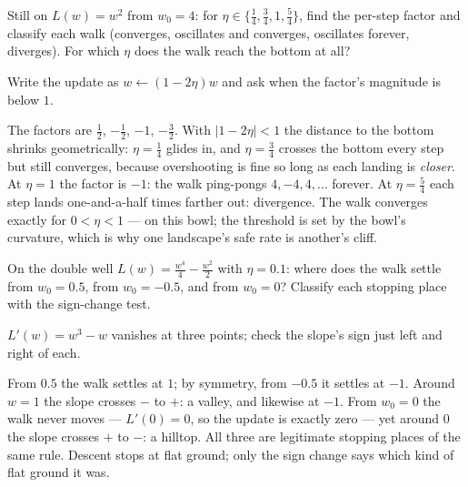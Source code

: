 \begin{problem}
Still on $L(w) = w^2$ from $w_0 = 4$: for
$\eta \in \{\tfrac14, \tfrac34, 1, \tfrac54\}$, find the per-step
factor and classify each walk (converges, oscillates and converges,
oscillates forever, diverges). For which $\eta$ does the walk reach
the bottom at all?
\begin{hint}
Write the update as $w \leftarrow (1 - 2\eta) w$ and ask when the
factor's magnitude is below $1$.
\end{hint}
\begin{solution}
The factors are $\tfrac12$, $-\tfrac12$, $-1$, $-\tfrac32$. With
$|1 - 2\eta| < 1$ the distance to the bottom shrinks geometrically:
$\eta = \tfrac14$ glides in, and $\eta = \tfrac34$ crosses the bottom
every step but still converges, because overshooting is fine so long
as each landing is \emph{closer}. At $\eta = 1$ the factor is $-1$:
the walk ping-pongs $4, -4, 4, \dots$ forever. At $\eta = \tfrac54$
each step lands one-and-a-half times farther out: divergence. The
walk converges exactly for $0 < \eta < 1$ — on this bowl; the
threshold is set by the bowl's curvature, which is why one landscape's
safe rate is another's cliff.
\end{solution}
\end{problem}

\begin{problem}
On the double well $L(w) = \tfrac{w^4}{4} - \tfrac{w^2}{2}$ with
$\eta = 0.1$: where does the walk settle from $w_0 = 0.5$, from
$w_0 = -0.5$, and from $w_0 = 0$? Classify each stopping place with
the sign-change test.
\begin{hint}
$L'(w) = w^3 - w$ vanishes at three points; check the slope's sign
just left and right of each.
\end{hint}
\begin{solution}
From $0.5$ the walk settles at $1$; by symmetry, from $-0.5$ it
settles at $-1$. Around $w = 1$ the slope crosses $-$ to $+$: a
valley, and likewise at $-1$. From $w_0 = 0$ the walk never moves —
$L'(0) = 0$, so the update is exactly zero — yet around $0$ the
slope crosses $+$ to $-$: a hilltop. All three are legitimate
stopping places of the same rule. Descent stops at flat ground;
only the sign change says which kind of flat ground it was.
\end{solution}
\end{problem}

